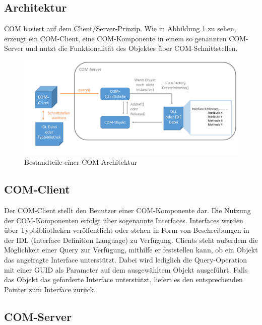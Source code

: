 \subsection{Architektur}
\label{ch:grundlagen:sec:ComponentObjectModel:subsec:Architektur}

COM basiert auf dem Client/Server-Prinzip. Wie in Abbildung \ref{GL_COM} zu sehen, erzeugt ein COM-Client, eine COM-Komponente in einem so genannten COM-Server und nutzt die Funktionalität des Objektes über COM-Schnittstellen. 

\begin{figure}[htbp]
	\centering
  \includegraphics[width=1.0\textwidth, width=1.0\textwidth]{pics/Grundlagen_com.pdf}
	\caption{Bestandteile einer COM-Architektur}
	\label{GL_COM}
\end{figure} 

\subsection{COM-Client}
\label{ch:grundlagen:sec:ComponentObjectModel:subsec:COMClient}

Der COM-Client stellt den Benutzer einer COM-Komponente dar. Die Nutzung der COM-Komponenten erfolgt über sogenannte Interfaces. Interfaces werden über Typbibliotheken veröffentlicht oder stehen in Form von Beschreibungen in der IDL (Interface Definition Language) zu Verfügung. Clients steht außerdem die Möglichkeit einer Query zur Verfügung, mithilfe er feststellen kann, ob ein Objekt das angefragte Interface unterstützt. Dabei wird lediglich die Query-Operation mit einer GUID als Parameter auf dem ausgewähltem Objekt ausgeführt. Falls das Objekt das geforderte Interface unterstützt, liefert es den entsprechenden Pointer zum Interface zurück.  

\subsection{COM-Server}
\label{ch:grundlagen:sec:ComponentObjectModel:subsec:COMServer}

